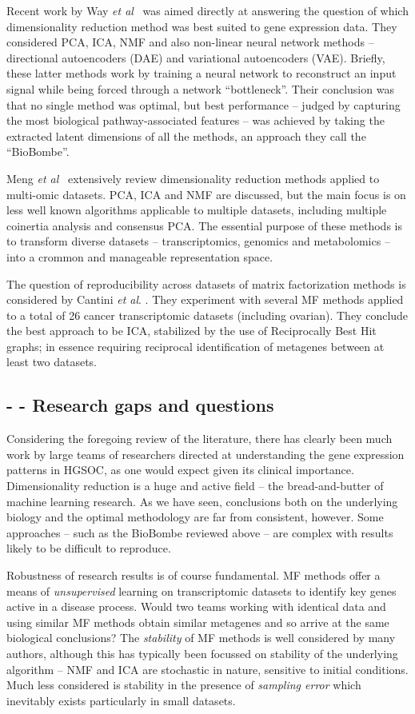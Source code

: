 \documentclass[tikz, 11pt,a4paper,oneside,fleqn, draft]{article}
\newcommand{\etal}{{\em et al\/}}
\begin{document}
Recent work by Way \etal\ \cite{WayGregory2019} was aimed directly at answering the question of which dimensionality reduction method was best suited to gene expression data.  They considered PCA, ICA, NMF and also non-linear neural network methods -- directional autoencoders (DAE)  and variational autoencoders (VAE).  Briefly, these latter methods work by training a neural network to reconstruct an input signal while being forced through a network ``bottleneck''.   Their conclusion was that no single method was optimal, but best performance -- judged by capturing the most biological pathway-associated features -- was achieved by taking the extracted latent dimensions of all the methods, an approach they call the ``BioBombe''.

Meng \etal\ \cite{Meng2016} extensively review dimensionality reduction methods applied to multi-omic datasets.   PCA, ICA and NMF are discussed, but the main focus is on less well known algorithms applicable to multiple datasets, including multiple coinertia analysis and consensus PCA.  The essential purpose of these methods is to transform diverse datasets -- transcriptomics, genomics and metabolomics  -- into a crommon and manageable representation space.

The question of reproducibility across datasets of matrix factorization methods is considered by Cantini \etal. \cite{Cantini2019}.  They experiment with several MF methods applied to a total of 26 cancer transcriptomic datasets (including ovarian).  They conclude the best approach to be ICA, stabilized by the use of Reciprocally Best Hit graphs; in essence requiring reciprocal identification of metagenes between at least two datasets.

\subsection{- - Research gaps and questions}
Considering the foregoing review of the literature, there has clearly been much work by large teams of researchers directed at understanding the gene expression patterns in HGSOC, as one would expect given its clinical importance.  
Dimensionality reduction is a huge and active field -- the bread-and-butter of machine learning research. 
As we have seen, conclusions both on the underlying biology and the optimal methodology are far from consistent, however.   Some approaches -- such as the BioBombe reviewed above -- are complex with results likely to be difficult to reproduce.   

Robustness of research results is of course fundamental.  MF methods offer a means of \emph{unsupervised} learning on transcriptomic datasets to identify key genes active in a disease process.  Would two teams working with identical data and using similar MF methods obtain similar metagenes and so arrive at the same biological conclusions?   The \emph{stability} of MF methods is well considered by many authors, although this has typically been focussed on stability of the underlying algorithm -- NMF and ICA are stochastic in nature, sensitive to initial conditions.   Much less considered is stability in the presence of \emph{sampling error} which inevitably exists particularly in small datasets.
\end{document}
